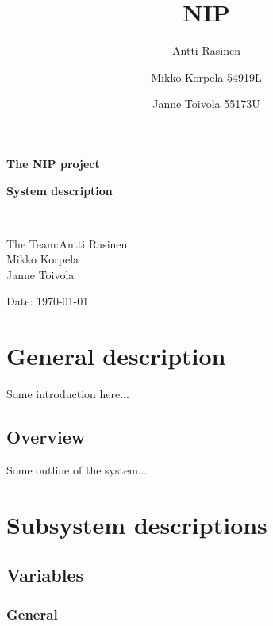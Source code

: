 \documentclass[12pt,a4paper]{report}
\title{NIP}
\author{Antti Rasinen}
\author{Mikko Korpela 54919L}
\author{Janne Toivola 55173U}
\begin{document}
\pagestyle{empty}
\setlength{\parindent}{0mm}
\setlength{\parskip}{3mm}

\large
\textbf{The NIP project}\\

\vspace{45mm}

\begin{centering}
\huge
\textbf{System description}\\ %
\end{centering}

\parbox{5cm}{\ }
\parbox{1em}{\vskip8cm}

\normalsize
\vspace{5mm}
\begin{tabbing}
The Team:\= Antti Rasinen\\
         \> Mikko Korpela\\
         \> Janne Toivola\\
\vspace{5mm}

\end{tabbing}
Date: \today
\eject\newpage

\pagestyle{plain}

\tableofcontents

%

\newpage
\chapter{General description}

Some introduction here...

\section{Overview}

Some outline of the system...

\newpage
\chapter{Subsystem descriptions}
\section{Variables}
\subsection{General}
\end{document}
